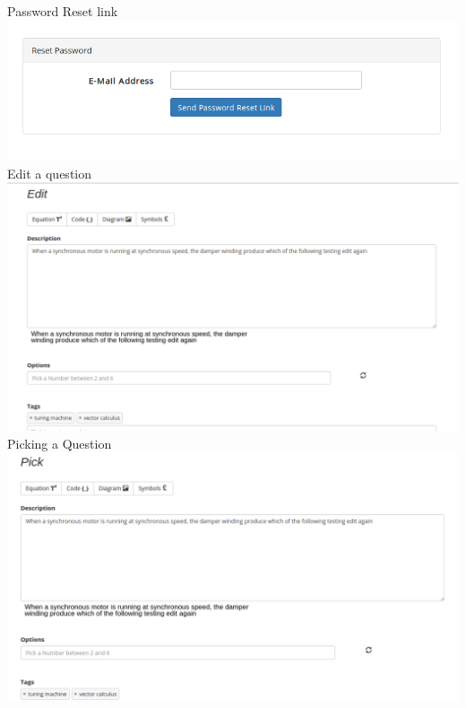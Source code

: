 \documentclass[a4paper,12pt,oneside]{book}
\begin{document}
\vspace{2in}
Password Reset link \\
\includegraphics[scale=0.4]{password.png}	\\

\vspace{1in}
Edit a question \\
\includegraphics[scale=0.4]{edit.png}	\\

\vspace{2in}
Picking a Question \\
\includegraphics[scale=0.34]{pick.png}	\\

\vspace{4in}
\end{document}
